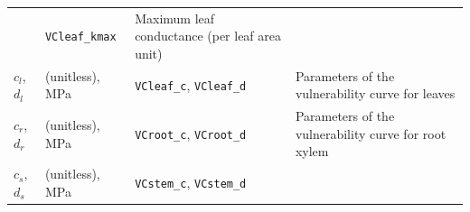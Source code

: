 \documentclass[]{book}
\begin{document}
\begin{longtable}[]{@{}llll@{}}
\begin{minipage}[t]{0.10\columnwidth}
\end{minipage} & \begin{minipage}[t]{0.12\columnwidth}\raggedright\strut
\texttt{VCleaf\_kmax}\strut
\end{minipage} & \begin{minipage}[t]{0.45\columnwidth}\raggedright\strut
Maximum leaf conductance (per leaf area unit)\strut
\end{minipage}\tabularnewline
\begin{minipage}[t]{0.11\columnwidth}\raggedright\strut
\(c_l\), \(d_l\)\strut
\end{minipage} & \begin{minipage}[t]{0.10\columnwidth}\raggedright\strut
(unitless), MPa\strut
\end{minipage} & \begin{minipage}[t]{0.12\columnwidth}\raggedright\strut
\texttt{VCleaf\_c}, \texttt{VCleaf\_d}\strut
\end{minipage} & \begin{minipage}[t]{0.45\columnwidth}\raggedright\strut
Parameters of the vulnerability curve for leaves\strut
\end{minipage}\tabularnewline
\begin{minipage}[t]{0.11\columnwidth}\raggedright\strut
\(c_r\), \(d_r\)\strut
\end{minipage} & \begin{minipage}[t]{0.10\columnwidth}\raggedright\strut
(unitless), MPa\strut
\end{minipage} & \begin{minipage}[t]{0.12\columnwidth}\raggedright\strut
\texttt{VCroot\_c}, \texttt{VCroot\_d}\strut
\end{minipage} & \begin{minipage}[t]{0.45\columnwidth}\raggedright\strut
Parameters of the vulnerability curve for root xylem\strut
\end{minipage}\tabularnewline
\begin{minipage}[t]{0.11\columnwidth}\raggedright\strut
\(c_s\), \(d_s\)\strut
\end{minipage} & \begin{minipage}[t]{0.10\columnwidth}\raggedright\strut
(unitless), MPa\strut
\end{minipage} & \begin{minipage}[t]{0.12\columnwidth}\raggedright\strut
\texttt{VCstem\_c}, \texttt{VCstem\_d}\strut
\end{minipage} & \begin{minipage}[t]{0.45\columnwidth}\raggedright\strut

\end{minipage}
\end{longtable}
\end{document}
